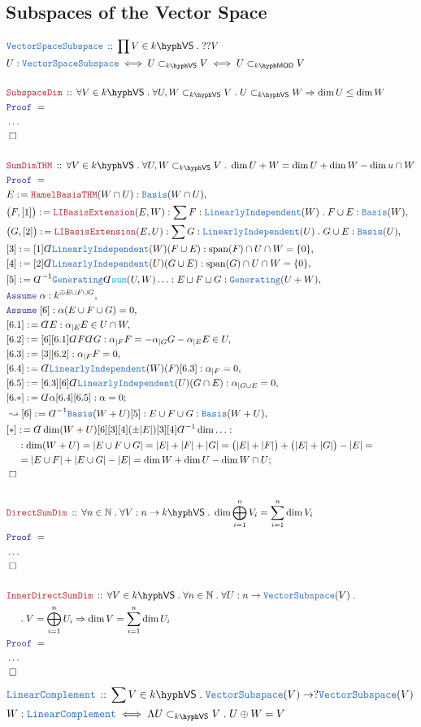 \documentclass[12pt]{scrartcl}%
\newcommand{\TYPE}[1]{\textcolor{NavyBlue}{\mathtt{#1}}}%
\newcommand{\FUNC}[1]{\textcolor{Cerulean}{\mathtt{#1}}}%
\newcommand{\LOGIC}[1]{\textcolor{Blue}{\mathtt{#1}}}%
\newcommand{\THM}[1]{\textcolor{Maroon}{\mathtt{#1}}}%
\renewcommand{\.}{\; . \;} %
\newcommand{\de}{: \kern 0.1pc =} %
\newcommand{\Theorem}[2]{& \THM{#1} \, :: \, #2 \\ & \Proof = \\ } %
\newcommand{\DeclareType}[2]{& \TYPE{#1} \, :: \, #2 \\}%
\newcommand{\DefineType}[3]{& #1 : \TYPE{#2} \iff #3 \\}%
\newcommand{\DefineNamedType}[4]{& #1 : \TYPE{#2} \iff #3 \iff #4 \\}%
\newcommand{\NewLine}{\\ & \kern 1pc}%
\newcommand{\Page}[1]{ \begin{align*} #1 \end{align*}  }%
\newcommand{ \bd }{ \ByDef }%
\newcommand{\NoProof}{ & \ldots \\ \EndProof}%
\newcommand{\Nat}{\mathbb{N}}%
\newcommand{\Say}[3]{& #1 \de #2 : #3, \\} %
\newcommand{\Conclude}[3]{& #1 \de #2 : #3; \\}%
\newcommand{\Derive}[3]{& \leadsto #1 \de #2 : #3, \\} %
\newcommand{\Assume}[2]{& \LOGIC{Assume} \; #1 : #2, \\} %
\newcommand{\QED}{\; \square} %
\newcommand{\EndProof}{& \QED \\} %
\newcommand{\ByDef}{\rotatebox[origin=c]{-180}{$D$}}%
\newcommand{\Proof}{\LOGIC{Proof} \; } %
\newcommand{\Basis}{\TYPE{Basis}} %
\newcommand{\submod}[1]{\subset_{\LMOD{#1}}}%
\newcommand{\subvec}[1]{\subset_{\VS{#1}}}%
\newcommand{\LI}{\TYPE{LinearlyIndependent}}
\DeclareMathOperator{\Span}{span} %
\newcommand{\VS}[1]{#1\hyph\mathsf{VS}} %
\newcommand{\LMOD}[1]{#1\hyph\mathsf{MOD}} %
\begin{document}
\subsection{Subspaces of the Vector Space}
\Page{
	\DeclareType{VectorSpaceSubspace}{\prod V \in \VS{k} \. ??V}
	\DefineNamedType{U}{VectorSpaceSubspace}{ U \subvec{k} V}{U \submod{k} V}
	\\
	\Theorem{SubspaceDim}{\forall V \in \VS{k} \. \forall U,W \subvec{k} V \. U \subvec{k} W \Rightarrow \dim U \le \dim W   } 
	\NoProof
	\\
	\Theorem{SumDimTHM}{\forall V \in \VS{k} \. \forall U,W \subvec{k} V \. \dim U + W = \dim U + \dim W - \dim u \cap W}
	\Say{E}{\THM{HamelBasisTHM}(W \cap U)}{\Basis(W \cap U)}
	\Say{\big(F,[1]\big)}{\THM{LIBasisExtension}(E,W)}{\sum F : \LI(W) \.  F \cup E : \Basis(W)}
	\Say{\big(G,[2]\big)}{\THM{LIBasisExtension}(E,U)}{\sum G : \LI(U) \.  G \cup E : \Basis(U)}
	\Say{[3]}{[1]\bd \LI(W)(F \cup E)}{\Span(F) \cap U \cap W = \{0\}}
	\Say{[4]}{[2]\bd \LI(U)(G \cup E)}{\Span(G) \cap U \cap W = \{0\}}
	\Say{[5]}{\bd^{-1} \TYPE{Generating}\bd \FUNC{sum}(U,W)\ldots}
	{    E \sqcup F \sqcup G : \TYPE{Generating}(U + W)  }
	\Assume{\alpha}{k^{\oplus E \cup F \cup G}}
	\Assume{[6]}{\alpha(E \cup F \cup G) = 0}
	\Say{[6.1]}{\bd E}{\alpha_{|E}E \in U \cap W}
	\Say{[6.2]}{[6][6.1]\bd F \bd G}{  \alpha_{|F}F =  -\alpha_{|G}G - \alpha_{|E}E \in U   }	
	\Say{[6.3]}{[3][6.2]}{\alpha_{|F}F = 0}
	\Say{[6.4]}{\bd \LI(W)(F)[6.3]}{\alpha_{|F} = 0}
	\Say{[6.5]}{[6.3][6]\bd \LI(U)(G \cap E)}{\alpha_{|G \cup E} = 0}
	\Conclude{[6.*]}{\bd \alpha [6.4][6.5]}{\alpha = 0}
	\Derive{[6]}{\bd^{-1} \Basis(W + U) [5]}{E \cup F \cup G : \Basis(W + U)}
	\Conclude{[*]}{\bd \dim(W+U)[6][3][4](\pm |E|)[3][4]\bd^{-1} \dim \ldots}{
		\NewLine :
		\dim(W + U) = 
		|E \cup F \cup G| = 
		|E| + |F| + |G| = 
		\big(|E| + |F|\big) + \big(|E| + |G|\big) - |E| = \NewLine =
		| E \cup F| + |E \cup G| - |E| =
		\dim W + \dim U - \dim W \cap U }
	\EndProof
	\\
	\Theorem{DirectSumDim}{\forall n \in \Nat \. \forall V : n \to \VS{k} \. \dim \bigoplus^n_{i=1} V_i = \sum^n_{i=1} \dim V_i}
	\NoProof
	\\
	\Theorem{InnerDirectSumDim}{
		\forall V \in \VS{k} \. 
		\forall n \in \Nat \. 
		\forall U : n \to \TYPE{VectorSubspace}(V) \. \NewLine \. 
		V = \bigoplus^n_{i=1} U_i \Rightarrow \dim V  = \sum^n_{i=1}  \dim U_i
	}
	\NoProof
}\Page{
	\DeclareType{LinearComplement}{\sum V \in \VS{k} \. \TYPE{VectorSubspace}(V) \to ?\TYPE{VectorSubspace}(V)}
	\DefineType{W}{LinearComplement}{\Lambda U \subvec{k} V \. U \oplus W = V}
}
\end{document}
